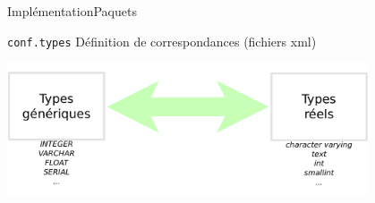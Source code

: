 \begin{frame}{Implémentation}{Paquets}
	\begin{block}{\texttt{conf.types}}
	Définition de correspondances (fichiers xml)
	\begin{center}
		\includegraphics[width=0.8\textwidth]{files/generic_types}	
	\end{center}
	\end{block}
\end{frame}